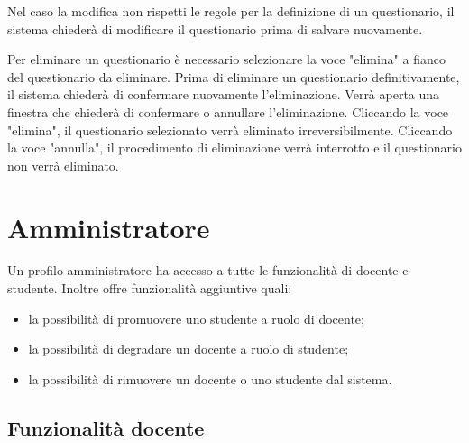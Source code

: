 \documentclass[12pt,a4paper]{article}
\begin{document}
		Nel caso la modifica non rispetti le regole per la definizione di un questionario, il sistema chiederà di modificare il questionario prima di salvare nuovamente.
			
		Per eliminare un questionario è necessario selezionare la voce "elimina" a fianco del questionario da eliminare. Prima di eliminare un questionario definitivamente, il sistema chiederà di confermare nuovamente l'eliminazione.
		Verrà aperta una finestra che chiederà di confermare o annullare l'eliminazione. Cliccando la voce "elimina", il questionario selezionato verrà eliminato irreversibilmente. Cliccando la voce "annulla", il procedimento di eliminazione verrà interrotto e il questionario non verrà eliminato.

	
		\section{Amministratore}
		Un profilo amministratore ha accesso a tutte le funzionalità di docente e studente.
		Inoltre offre funzionalità aggiuntive quali:
		\begin{itemize}
			\item la possibilità di promuovere uno studente a ruolo di docente;
			\item la possibilità di degradare un docente a ruolo di studente;
			\item la possibilità di rimuovere un docente o uno studente dal sistema.
		\end{itemize}
		\subsection{Funzionalità docente}
		
\end{document}
